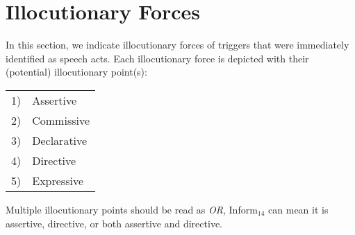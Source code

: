 \chapter{Illocutionary Forces}

In this section, we indicate illocutionary forces of triggers that were immediately identified as speech acts.
Each illocutionary force is depicted with their (potential) illocutionary point(s):

\begin{center}
	\begin{tabular}{ll}
		1) & Assertive \\
		2) & Commissive \\
		3) & Declarative \\
		4) & Directive \\
		5) & Expressive \\
	\end{tabular}
\end{center}

Multiple illocutionary points should be read as \emph{OR},
\eg Inform$_{14}$ can mean it is
	assertive,
	directive,
	or both assertive and directive.